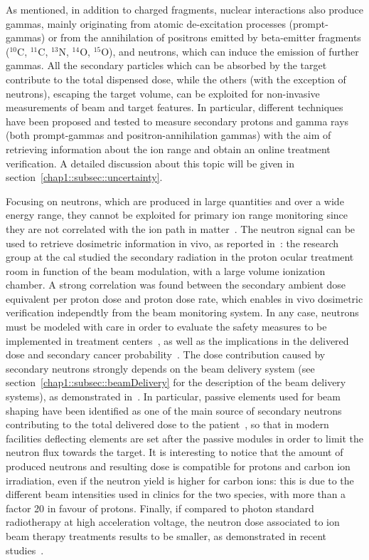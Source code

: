 As mentioned, in addition to charged fragments, nuclear interactions also produce gammas, mainly originating from atomic de-excitation processes (prompt-gammas) or from the annihilation of positrons emitted by beta-emitter fragments ($^{10}$C, $^{11}$C, $^{13}$N, $^{14}$O, $^{15}$O), and neutrons, which can induce the emission of further gammas. All the secondary particles which can be absorbed by the target contribute to the total dispensed dose, while the others (with the exception of neutrons), escaping the target volume, can be exploited for non-invasive measurements of beam and target features. In particular, different techniques have been proposed and tested to measure secondary protons and gamma rays (both prompt-gammas and positron-annihilation gammas) with the aim of retrieving information about the ion range and obtain an online treatment verification. A detailed discussion about this topic will be given in section~\ref{chap1::subsec::uncertainty}.

Focusing on neutrons, which are produced in large quantities and over a wide energy range, they cannot be exploited for primary ion range monitoring since they are not correlated with the ion path in matter~\parencite{Testa2010}. The neutron signal can be used to retrieve dosimetric information in vivo, as reported in~\cite{Carnicer2014}: the research group at the \gls{cal} studied the secondary radiation in the proton ocular treatment room in function of the beam modulation, with a large volume ionization chamber. A strong correlation was found between the secondary ambient dose equivalent per proton dose and proton dose rate, which enables in vivo dosimetric verification independtly from the beam monitoring system. In any case, neutrons must be modeled with care in order to evaluate the safety measures to be implemented in treatment centers~\parencite{Newhauser2002}, as well as the implications in the delivered dose and secondary cancer probability~\parencite{Newhauser2011}. The dose contribution caused by secondary neutrons strongly depends on the beam delivery system (see section~\ref{chap1::subsec::beamDelivery} for the description of the beam delivery systems), as demonstrated in~\cite{Gottschalk2006}. In particular, passive elements used for beam shaping have been identified as one of the main source of secondary neutrons contributing to the total delivered dose to the patient~\parencite{Yan2002}, so that in modern facilities deflecting elements are set after the passive modules in order to limit the neutron flux towards the target. It is interesting to notice that the amount of produced neutrons and resulting dose is compatible for protons and carbon ion irradiation, even if the neutron yield is higher for carbon ions: this is due to the different beam intensities used in clinics for the two species, with more than a factor 20 in favour of protons. Finally, if compared to photon standard radiotherapy at high acceleration voltage, the neutron dose associated to ion beam therapy treatments results to be smaller, as demonstrated in recent studies~\parencite{Schneider2015}. 

